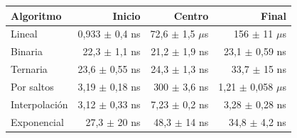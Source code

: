 {\small
\begin{tabular}{lrrr}
\toprule
Algoritmo & Inicio & Centro & Final \\
\midrule
Lineal & 0,933 $\pm$ 0,4 ns & 72,6 $\pm$ 1,5 $\mu$s & 156 $\pm$ 11 $\mu$s \\
Binaria & 22,3 $\pm$ 1,1 ns & 21,2 $\pm$ 1,9 ns & 23,1 $\pm$ 0,59 ns \\
Ternaria & 23,6 $\pm$ 0,55 ns & 24,3 $\pm$ 1,3 ns & 33,7 $\pm$ 15 ns \\
Por saltos & 3,19 $\pm$ 0,18 ns & 300 $\pm$ 3,6 ns & 1,21 $\pm$ 0,058 $\mu$s \\
Interpolaci\'on & 3,12 $\pm$ 0,33 ns & 7,23 $\pm$ 0,2 ns & 3,28 $\pm$ 0,28 ns \\
Exponencial & 27,3 $\pm$ 20 ns & 48,3 $\pm$ 14 ns & 34,8 $\pm$ 4,2 ns \\
\bottomrule
\end{tabular}}\par
